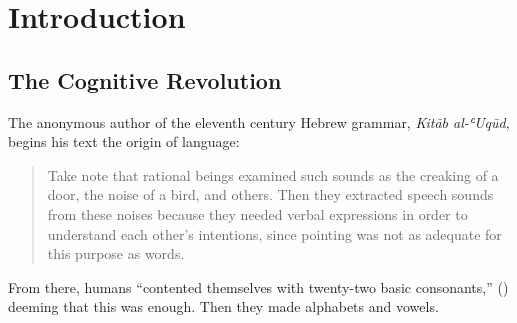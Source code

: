 
\chapter{Introduction}  %




\section{The Cognitive Revolution}


The anonymous author of the eleventh century Hebrew grammar, \textit{Kitāb al-ʿUqūd}, begins 
his text the origin of language:

\begin{quotation}
  Take note that rational beings examined such sounds as the creaking of a door, the noise of 
  a bird, and others. Then they extracted speech sounds from these noises because they needed
  verbal expressions in order to understand each other's intentions, since pointing was not as 
  adequate for this purpose as words. \cite[26]{Vidro2013}
\end{quotation}

From there, humans ``contented themselves with twenty-two basic consonants,'' (\citeauthor[26]{Vidro2013})
deeming that this was enough. Then they made alphabets and vowels.